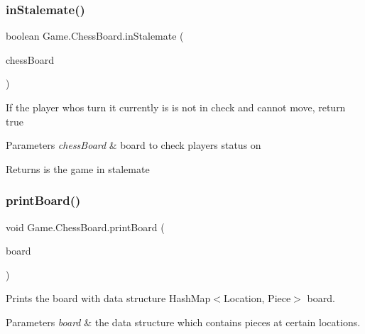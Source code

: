 \subsubsection{\texorpdfstring{in\+Stalemate()}{inStalemate()}}
{\footnotesize\ttfamily boolean Game.\+Chess\+Board.\+in\+Stalemate (\begin{DoxyParamCaption}\item[{\hyperlink{class_game_1_1_chess_board}{Chess\+Board}}]{chess\+Board }\end{DoxyParamCaption})\hspace{0.3cm}{\ttfamily [inline]}}

If the player who\textquotesingle{}s turn it currently is is not in check and cannot move, return true 
\begin{DoxyParams}{Parameters}
{\em chess\+Board} & board to check players status on \\
\hline
\end{DoxyParams}
\begin{DoxyReturn}{Returns}
is the game in stalemate 
\end{DoxyReturn}
\mbox{\label{class_game_1_1_chess_board_ac47067200b06bc4d11ca660c7a409956}} 
\subsubsection{\texorpdfstring{print\+Board()}{printBoard()}}
{\footnotesize\ttfamily void Game.\+Chess\+Board.\+print\+Board (\begin{DoxyParamCaption}\item[{Hash\+Map$<$ \hyperlink{class_game_1_1_location}{Location}, \hyperlink{class_game_1_1_piece}{Piece} $>$}]{board }\end{DoxyParamCaption})\hspace{0.3cm}{\ttfamily [inline]}}

Prints the board with data structure Hash\+Map$<$\+Location, Piece$>$ board. 
\begin{DoxyParams}{Parameters}
{\em board} & the data structure which contains pieces at certain locations. \\
\hline
\end{DoxyParams}
\mbox{\label{class_game_1_1_chess_board_abe952ff3498a25cf31170ff416ca6954}} 
